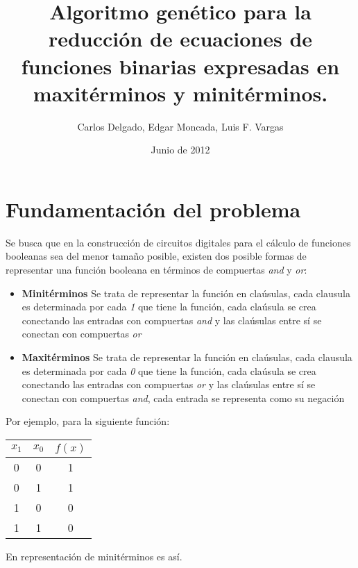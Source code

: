 \documentclass[a4paper]{article}
\title{Algoritmo genético para la reducción de ecuaciones de funciones binarias expresadas en maxitérminos y minitérminos.}
\author{Carlos Delgado, Edgar Moncada, Luis F. Vargas}
\date{Junio de 2012}
\begin{document}
\maketitle{}
\renewcommand{\tablename}{\textbf{Tabla}}


\section{Fundamentación del problema}

Se busca que en la construcción de circuitos digitales para el cálculo de funciones booleanas sea del menor tamaño posible, existen dos posible formas de representar una función booleana en términos de compuertas \textit{and} y \textit{or}:

\begin{itemize}
	\item \textbf{Minitérminos} Se trata de representar la función en claúsulas, cada clausula es determinada por cada \textit{1} que tiene la función, cada claúsula se crea conectando las entradas con compuertas \textit{and} y las claúsulas entre sí se conectan con compuertas \textit{or}
	\item \textbf{Maxitérminos} Se trata de representar la función en claúsulas, cada clausula es determinada por cada \textit{0} que tiene la función, cada claúsula se crea conectando las entradas con compuertas \textit{or} y las claúsulas entre sí se conectan con compuertas \textit{and}, cada entrada se representa como su negación
\end{itemize}

Por ejemplo, para la siguiente función:

\begin{table}[H]
	\centering
	\begin{tabular}{|c | c | c|}
		\hline
		$x_1$ & $x_0$ & $f(x)$ \\
		\hline
		\hline
		0 & 0& 1\\
		\hline
		0 & 1 & 1\\
		\hline
		1 & 0& 0\\
		\hline
		1 & 1 & 0\\
		\hline
	\end{tabular}
\end{table}

En representación de minitérminos es así.
\end{document}
